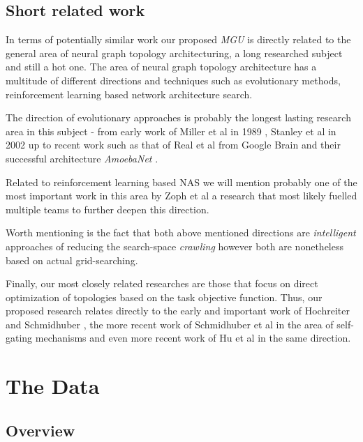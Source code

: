 \documentclass[11pt]{article}
\begin{document}
\hypertarget{short-related-work}{%
\subsection{Short related work}\label{short-related-work}}

In terms of potentially similar work our proposed \emph{MGU} is directly
related to the general area of neural graph topology architecturing, a
long researched subject and still a hot one. The area of neural graph
topology architecture has a multitude of different directions and
techniques such as evolutionary methods, reinforcement learning based
network architecture search.

The direction of evolutionary approaches is probably the longest lasting
research area in this subject - from early work of Miller et al in 1989
\cite{miller1989designing}, Stanley et al in 2002
\cite{stanley2002evolving} up to recent work such as that of Real et al
from Google Brain \cite{real2019regularized} and their successful
architecture \emph{AmoebaNet} .

Related to reinforcement learning based NAS we will mention probably one
of the most important work in this area by Zoph et al
\cite{zoph2018learning} a research that most likely fuelled multiple
teams to further deepen this direction.

Worth mentioning is the fact that both above mentioned directions are
\emph{intelligent} approaches of reducing the search-space
\emph{crawling} however both are nonetheless based on actual
grid-searching.

Finally, our most closely related researches are those that focus on
direct optimization of topologies based on the task objective function.
Thus, our proposed research relates directly to the early and important
work of Hochreiter and Schmidhuber \cite{hochreiter1997long}, the more
recent work of Schmidhuber et al in the area of self-gating mechanisms
\cite{srivastava2015highway} and even more recent work of Hu et al
\cite{hu2019squeezeandexcitation} in the same direction.

    \hypertarget{the-data}{%
\section{The Data}\label{the-data}}

\hypertarget{overview}{%
\subsection{Overview}\label{overview}}
\end{document}
